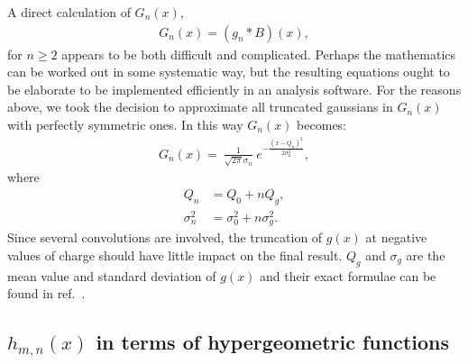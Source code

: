 \documentclass[preprint,12pt]{elsarticle}
\begin{document}
A direct calculation of $G_n(x)$, 
\begin{align}
G_n(x)  = (g_n*B)(x),
\end{align}   
for $n\geq 2$ appears to be both difficult and complicated. 
Perhaps the mathematics can be worked out in some systematic way, but the resulting equations ought to be elaborate to be implemented efficiently in an analysis software. 
For the reasons above, we took the decision to approximate all truncated gaussians in $G_n(x)$ with perfectly symmetric ones. 
In this way $G_n(x)$ becomes:
\begin{align}
G_n(x)  = \ \frac{1}{\sqrt{2\pi} \sigma_n } \ e^{ -\frac{ (x-Q_n)^2 }{2\sigma_n^2} },
\end{align}   
where
\begin{align}
Q_n  & = Q_0 + n Q_g, \\
\sigma_n^2 & = \sigma_0^2 + n \sigma_g^2.  
\end{align}   
Since several convolutions are involved, the truncation of $g(x)$ at negative values of charge should have little impact on the final result.  
$Q_g$ and $\sigma_g$ are the mean value and standard deviation of $g(x)$ and their exact formulae can be found in ref.~\cite{me2}.


\subsection{$h_{m,n}(x)$ in terms of hypergeometric functions}
%
\end{document}
